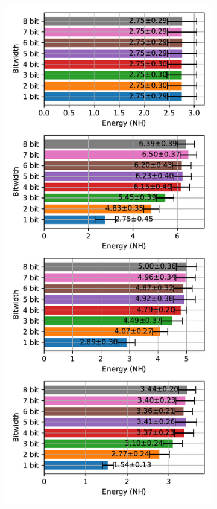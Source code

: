 \begin{figure}[H]
\begin{subfigure}[H]{0.495\textwidth}
                \includegraphics[width=\textwidth]{../standard/FashionMNIST/plots/fashionmnist_test_energy_nh.pdf}

\end{subfigure}
\end{figure}
